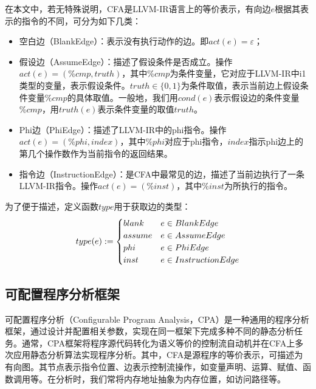 在本文中，若无特殊说明，CFA是LLVM-IR语言上的等价表示，有向边$ e $根据其表示的指令的不同，可分为如下几类：
\begin{itemize}
	\item 空白边（BlankEdge）：表示没有执行动作的边。即$ act(e) = \varepsilon $；
	
	\item 假设边（AssumeEdge）：描述了假设条件是否成立。操作$ act(e) = (\%cmp, truth) $，其中$ \%cmp $为条件变量，它对应于LLVM-IR中i1类型的变量，表示假设条件。$ truth \in \{0, 1\}$为条件取值，表示当前边上假设条件变量$ \%cmp $的具体取值。一般地，我们用$ cond(e) $表示假设边的条件变量$ \%cmp $，用$ truth(e) $表示条件变量的取值$ truth $。
	
	\item Phi边（PhiEdge）：描述了LLVM-IR中的phi指令。操作$ act(e) = (\%phi, index) $，其中$ \%phi $对应于phi指令，$ index $指示phi边上的第几个操作数作为当前指令的返回结果。
	
	\item 指令边（InstructionEdge）：是CFA中最常见的边，描述了当前边执行了一条LLVM-IR指令。操作$ act(e) = (\%inst) $，其中$ \%inst $为所执行的指令。
	

\end{itemize}

为了便于描述，定义函数$ type $用于获取边的类型：
\begin{align}{\label{align:edgeType}}
	type(e) := \begin{cases}
		blank & e \in BlankEdge\\
		assume & e \in AssumeEdge\\
		phi & e \in PhiEdge\\
		inst & e \in InstructionEdge
	\end{cases}
\end{align}

\subsection{可配置程序分析框架} 

可配置程序分析（Configurable Program Analysis，CPA）是一种通用的程序分析框架，通过设计并配置相关参数，实现在同一框架下完成多种不同的静态分析任务。通常，CPA框架将程序源代码转化为语义等价的控制流自动机并在CFA上多次应用静态分析算法实现程序分析。其中，CFA是源程序的等价表示，可描述为有向图。其节点表示指令位置、边表示控制流操作，如变量声明、运算、赋值、函数调用等。在分析时，我们常将内存地址抽象为内存位置，如访问路径\cite{cheng2000modular}等。

